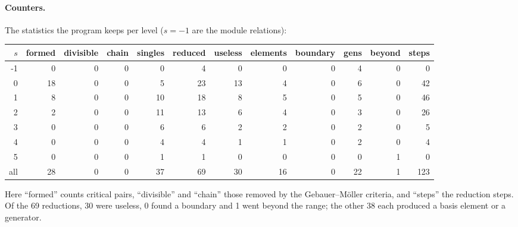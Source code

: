 \documentclass[11pt]{article}
\begin{document}
\paragraph{Counters.}
The statistics the program keeps per level ($s = -1$ are the module relations):
\begin{center}
\footnotesize\setlength{\tabcolsep}{3.5pt}
\begin{tabular}{rrrrrrrrrrrr}
\toprule
$s$ & formed & divisible & chain & singles & reduced & useless & elements & boundary & gens & beyond & steps \\
\midrule
-1 & 0 & 0 & 0 & 0 & 4 & 0 & 0 & 0 & 4 & 0 & 0 \\
0 & 18 & 0 & 0 & 5 & 23 & 13 & 4 & 0 & 6 & 0 & 42 \\
1 & 8 & 0 & 0 & 10 & 18 & 8 & 5 & 0 & 5 & 0 & 46 \\
2 & 2 & 0 & 0 & 11 & 13 & 6 & 4 & 0 & 3 & 0 & 26 \\
3 & 0 & 0 & 0 & 6 & 6 & 2 & 2 & 0 & 2 & 0 & 5 \\
4 & 0 & 0 & 0 & 4 & 4 & 1 & 1 & 0 & 2 & 0 & 4 \\
5 & 0 & 0 & 0 & 1 & 1 & 0 & 0 & 0 & 0 & 1 & 0 \\
all & 28 & 0 & 0 & 37 & 69 & 30 & 16 & 0 & 22 & 1 & 123 \\
\bottomrule
\end{tabular}
\end{center}
Here ``formed'' counts critical pairs, ``divisible'' and ``chain'' those removed by the Gebauer--M\"oller criteria, and ``steps'' the reduction steps. Of the 69 reductions, 30 were useless, 0 found a boundary and 1 went beyond the range; the other 38 each produced a basis element or a generator.
\end{document}
